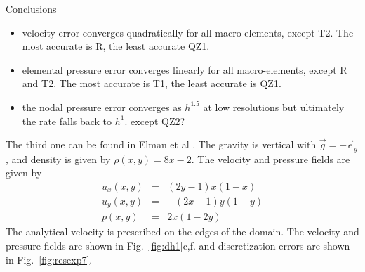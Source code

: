 \documentclass[a4paper,12pt]{article}
\begin{document}
Conclusions
\begin{itemize}
\item velocity error converges quadratically for all macro-elements, except T2.
The most accurate is R, the least accurate QZ1.
\item elemental pressure error converges linearly for all macro-elements, except R and T2.
The most accurate is T1, the least accurate is QZ1.
\item the nodal pressure error converges as $h^{1.5}$ at low resolutions but ultimately 
the rate falls back to $h^1$. {\color{red} except QZ2?} 
\end{itemize}


The third one can be found in Elman et al \cite{elsw}.
The gravity is vertical with $\vec{g}=-\vec{e}_y$, and 
density is given by $\rho(x,y)=8x-2$. The velocity and pressure fields are given by
\begin{eqnarray}
u_x(x,y) &=&  (2y-1)x(1-x) \\
u_y(x,y) &=& - (2x-1)y(1-y) \\
p(x,y) &=& 2x(1 - 2y)
\end{eqnarray}
The analytical velocity is prescribed on the edges of the domain. 
The velocity and pressure fields are shown in Fig.~\ref{fig:dh1}c,f.
and discretization errors are shown in Fig.~\ref{fig:resexp7}.
\end{document}
